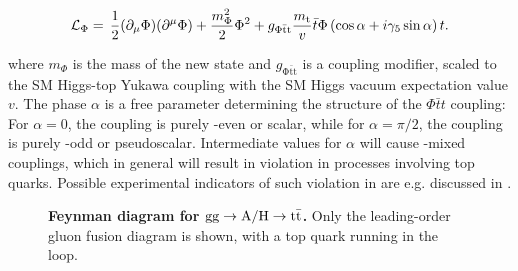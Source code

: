 \begin{equation}
\label{eq:theory:lag_ah}
    \mathcal{L}_{\Phi} = \, \frac{1}{2} (\partial_\mu \Phi ) (\partial^\mu \Phi ) +\frac{m_{\Phi}^2}{2} \Phi^2 
    + g_{\mathrm{\Phi \bar{t} t}} \frac{m_{\mathrm{t}}}{v} \bar{t} \Phi \left( \cos{\alpha} + i \gamma_5 \sin{\alpha} \right) t .
\end{equation}

\noindent where $m_\Phi$ is the mass of the new state and $g_{\mathrm{\Phi \bar{t} t}}$ is a coupling modifier, scaled to the SM Higgs-top Yukawa coupling with the SM Higgs vacuum expectation value $v$. The phase $\alpha$ is a free parameter determining the \CP structure of the $\Phi \bar{t} t$ coupling: For $\alpha = 0$, the coupling is purely \CP-even or scalar, while for $\alpha = \pi/2$, the coupling is purely \CP-odd or pseudoscalar. Intermediate values for $\alpha$ will cause \CP-mixed couplings, which in general will result in  \CP violation in processes involving top quarks. Possible experimental indicators of such \CP violation in \pptt are e.g. discussed in .

\begin{figure}[!t]
    \centering
    \caption{\textbf{Feynman diagram for $\mathrm{gg \rightarrow A/H \rightarrow \mathrm{t \bar{t}}}$.} Only the leading-order gluon fusion diagram is shown, with a top quark running in the loop.}
    \label{fig:theory:ggAH}
\end{figure}

